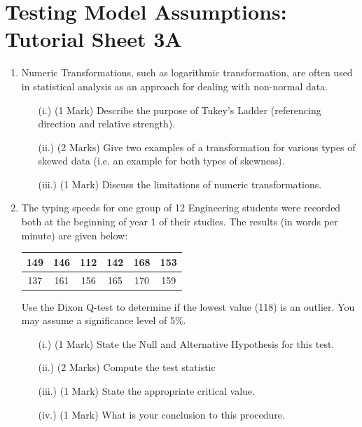 \documentclass[a4paper,12pt]{article}
\begin{document}
	\section*{Testing Model Assumptions: Tutorial Sheet 3A}


\begin{enumerate}


\item 
Numeric Transformations, such as logarithmic transformation, are often used in statistical analysis as an approach for dealing with non-normal data.
\begin{itemize}
	\item[(i.)] (1 Mark) Describe the purpose of Tukey's Ladder (referencing direction and relative strength).
	\item[(ii.)] (2 Marks) Give two examples of a transformation for various types of skewed data (i.e. an example for both types of skewness).
	\item[(iii.)] (1 Mark) Discuss the limitations of numeric transformations.
\end{itemize}
\bigskip

\item 
The typing speeds for one group of 12 Engineering students were recorded both at the beginning of year 1 of their studies. The results (in words per minute) are given below:

\begin{center}
	\begin{tabular}{|c|c|c|c|c|c|}
		\hline
		149  & 146 & 112 & 142 & 168& 153\\ \hline
		137 & 161 & 156& 165&  170&  159
		\\ \hline
	\end{tabular}
\end{center}
Use the Dixon Q-test to determine if the lowest value (118) is an outlier. You may assume a significance level of 5\%.
\begin{itemize}
	\item[(i.)](1 Mark)	State the Null and Alternative Hypothesis for this test.
	\item[(ii.)](2 Marks) Compute the test statistic
	\item[(iii.)](1 Mark) State the appropriate critical value.
	\item[(iv.)](1 Mark) What is your conclusion to this procedure.
\end{itemize}


\end{enumerate}
\end{document}
